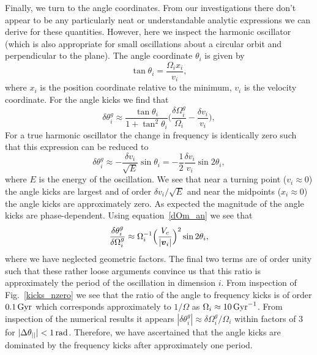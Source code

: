 \documentclass[useAMS,usenatbib,fleqn,a4paper]{mn2e}
\def\rad{\,\rm rad}
\def\Gyr{\,{\rm Gyr}}
\newcommand{\bs}[1]{\bmath{#1}}
\begin{document}
Finally, we turn to the angle coordinates. From our investigations there don't appear to be any particularly neat or understandable analytic expressions we can derive for these quantities. However, here we inspect the harmonic oscillator (which is also appropriate for small oscillations about a circular orbit and perpendicular to the plane). The angle coordinate $\theta_i$ is given by
\begin{equation}
\tan\theta_i = \frac{\Omega_i x_i}{v_i},
\end{equation}
where $x_i$ is the position coordinate relative to the minimum, $v_i$ is the velocity coordinate. For the angle kicks we find that
\begin{equation}
\delta\theta^g_i\approx \frac{\tan\theta_i}{1+\tan^2\theta_i}\Big(\frac{\delta\Omega^g_i}{\Omega_i}-\frac{\delta v_i}{v_i}\Big),
\end{equation}
For a true harmonic oscillator the change in frequency is identically zero such that this expression can be reduced to
\begin{equation}
\delta\theta^g_i\approx -\frac{\delta v_i}{\sqrt{E}}\sin\theta_i = -\frac{1}{2}\frac{\delta v_i}{v_i}\sin 2\theta_i,
\end{equation}
where $E$ is the energy of the oscillation. We see that near a turning point ($v_i\approx0$) the angle kicks are largest and of order $\delta v_i/\sqrt{E}$ and near the midpoints ($x_i\approx0$) the angle kicks are approximately zero. As expected the magnitude of the angle kicks are phase-dependent. Using equation~\eqref{dOm_an} we see that
\begin{equation}
\frac{\delta\theta_i^g}{\delta\Omega_i^g}\approx\Omega_i^{-1}\Big(\frac{V_c}{|\bs{v}_i|}\Big)^2\sin 2\theta_i,
\end{equation}
where we have neglected geometric factors. The final two terms are of order unity such that these rather loose arguments convince us that this ratio is approximately the period of the oscillation in dimension $i$. From inspection of Fig.~\ref{kicks_nzero} we see that the ratio of the angle to frequency kicks is of order $0.1\Gyr$ which corresponds approximately to $1/\Omega$ as $\Omega_i\approx10\Gyr^{-1}$. From inspection of the numerical results it appears $|\delta\theta^g_i|\approx\delta\Omega^g_i/\Omega_i$ within factors of $3$ for $|\Delta\theta_{||}|<1\rad$. Therefore, we have ascertained that the angle kicks are dominated by the frequency kicks after approximately one period.

\end{document}

